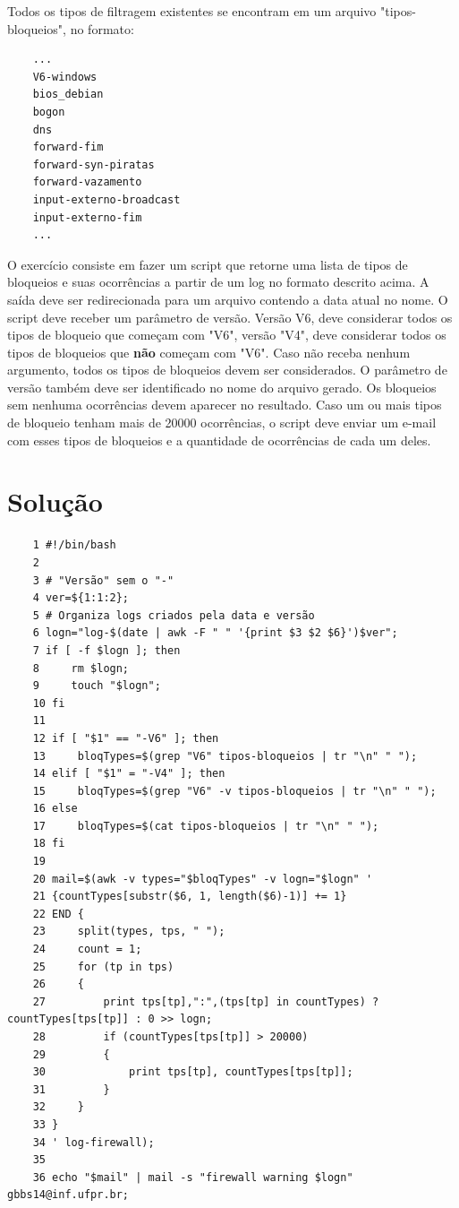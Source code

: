 \documentclass[oneside, 11 pt]{article}
\begin{document}
	\pagebreak
	
	Todos os tipos de filtragem existentes se encontram em um arquivo "tipos-bloqueios", no formato:
	
	\begin{lstlisting}
	...
	V6-windows
	bios_debian
	bogon
	dns
	forward-fim
	forward-syn-piratas
	forward-vazamento
	input-externo-broadcast
	input-externo-fim
	...
	\end{lstlisting}
	
	O exercício consiste em fazer um script que retorne uma lista de tipos de bloqueios e suas ocorrências a partir de um log no formato descrito acima. A saída deve ser redirecionada para um arquivo contendo a data atual no nome. O script deve receber um parâmetro de versão. Versão V6, deve considerar todos os tipos de bloqueio que começam com "V6", versão "V4", deve considerar todos os tipos de bloqueios que \textbf{não} começam com "V6". Caso não receba nenhum argumento, todos os tipos de bloqueios devem ser considerados. O parâmetro de versão também deve ser identificado no nome do arquivo gerado. Os bloqueios sem nenhuma ocorrências devem aparecer no resultado. Caso um ou mais tipos de bloqueio tenham mais de 20000 ocorrências, o script deve enviar um e-mail com esses tipos de bloqueios e a quantidade de ocorrências de cada um deles.
	
	\pagebreak
	
	\section{Solução}
	
	\begin{lstlisting}
	1 #!/bin/bash
	2 
	3 # "Versão" sem o "-"
	4 ver=${1:1:2};
	5 # Organiza logs criados pela data e versão
	6 logn="log-$(date | awk -F " " '{print $3 $2 $6}')$ver";
	7 if [ -f $logn ]; then
	8     rm $logn;
	9     touch "$logn";
	10 fi
	11 
	12 if [ "$1" == "-V6" ]; then
	13     bloqTypes=$(grep "V6" tipos-bloqueios | tr "\n" " ");
	14 elif [ "$1" = "-V4" ]; then
	15     bloqTypes=$(grep "V6" -v tipos-bloqueios | tr "\n" " ");
	16 else
	17     bloqTypes=$(cat tipos-bloqueios | tr "\n" " ");
	18 fi
	19 
	20 mail=$(awk -v types="$bloqTypes" -v logn="$logn" '
	21 {countTypes[substr($6, 1, length($6)-1)] += 1}
	22 END {
	23     split(types, tps, " ");
	24     count = 1;
	25     for (tp in tps)
	26     {
	27         print tps[tp],":",(tps[tp] in countTypes) ? countTypes[tps[tp]] : 0 >> logn;
	28         if (countTypes[tps[tp]] > 20000)
	29         {
	30             print tps[tp], countTypes[tps[tp]];
	31         }
	32     }
	33 }
	34 ' log-firewall);
	35 
	36 echo "$mail" | mail -s "firewall warning $logn" gbbs14@inf.ufpr.br;
	\end{lstlisting}
	
\end{document}
